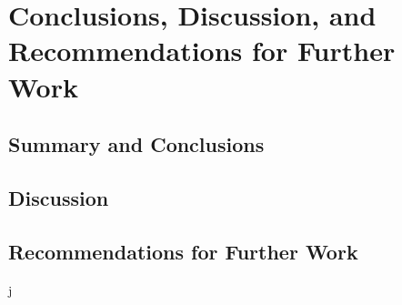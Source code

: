\chapter[Conclusions]{Conclusions, Discussion, and Recommendations for Further Work}

\section{Summary and Conclusions}

\section{Discussion}
\section{Recommendations for Further Work}
j